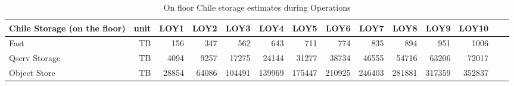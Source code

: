 \tiny \begin{longtable} { |p{}  |r  |r  |r  |r  |r  |r  |r  |r  |r  |r  |r  |r  |r |} 
\caption{On floor Chile storage estimates during Operations
 \label{tab:chileStorageOps}}\\ 
\hline 
\textbf{Chile Storage (on the floor)}&\textbf{unit}&\textbf{LOY1}&\textbf{LOY2}&\textbf{LOY3}&\textbf{LOY4}&\textbf{LOY5}&\textbf{LOY6}&\textbf{LOY7}&\textbf{LOY8}&\textbf{LOY9}&\textbf{LOY10}& \\ \hline
{Fast}&{TB}&{156}&{347}&{562}&{643}&{711}&{774}&{835}&{894}&{951}&{1006}& \\ \hline
{Qserv Storage}&{TB}&{4094}&{9257}&{17275}&{24144}&{31277}&{38734}&{46555}&{54716}&{63206}&{72017}& \\ \hline
{Object Store}&{TB}&{28854}&{64086}&{104491}&{139969}&{175447}&{210925}&{246403}&{281881}&{317359}&{352837}& \\ \hline
\end{longtable} \normalsize
